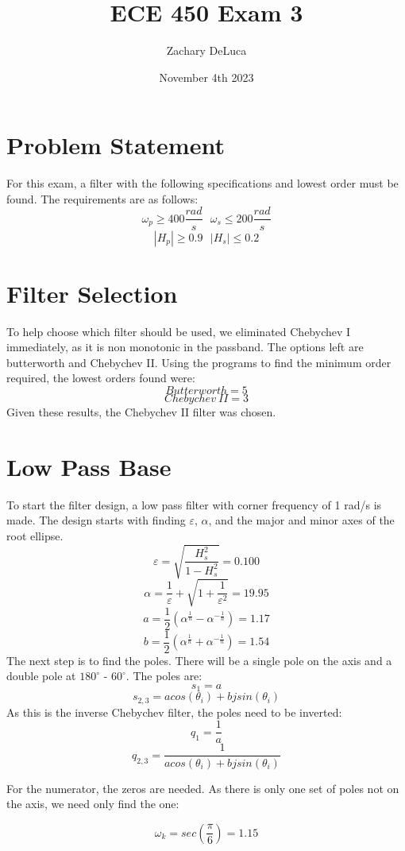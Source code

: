 \documentclass[12pt,a4paper]{article}
\title{ECE 450 Exam 3}
\author{Zachary DeLuca}
\date{November 4th 2023}
\begin{document}
	
	\maketitle
	\hline
	\section*{Problem Statement}
	For this exam, a filter with the following specifications and lowest order must be found. The requirements are as follows: 
	$$\omega_p \geq 400 \frac{rad}{s}\ \ \ \omega_s \leq 200 \frac{rad}{s}$$
	$$|H_p| \geq 0.9\ \ \ |H_s|\leq 0.2$$
	
	\section*{Filter Selection}
	To help choose which filter should be used, we  eliminated Chebychev I immediately, as it is non monotonic in the passband. The options left are butterworth and Chebychev II. Using the programs to find the minimum order required, the lowest orders found were: 
	$$Butterworth = 5$$
	$$Chebychev\ II= 3$$
	Given these results, the Chebychev II filter was chosen. 
	\section*{Low Pass Base}
	To start the filter design, a low pass filter with corner frequency of 1 rad/s is made. The design starts with finding $\varepsilon$, $\alpha$, and the major and minor axes of the root ellipse. 
	$$\varepsilon = \sqrt{\frac{H_s^2}{1-H_s^2}} = 0.100$$
	$$\alpha = \frac{1}{\varepsilon}+\sqrt{1+\frac{1}{\varepsilon^2}} = 19.95$$
	$$a = \frac{1}{2}\left(\alpha^{\frac{1}{n}}-\alpha^{-\frac{1}{n}}\right) = 1.17$$
	$$b = \frac{1}{2}\left(\alpha^{\frac{1}{n}}+\alpha^{-\frac{1}{n}}\right)=1.54$$
	The next step is to find the poles. There will be a single pole on the axis and a double pole at $180^{\circ}$ - $60^{\circ}$. The poles are: 
	$$s_1 = a$$
	$$s_{2,3}=acos(\theta_i) + bjsin(\theta_i)$$
	As this is the inverse Chebychev filter, the poles need to be inverted:
	$$q_{1} = \frac{1}{a}$$
	$$q_{2,3}=\frac{1}{acos(\theta_i) + bjsin(\theta_i)}$$
	
	For the numerator, the zeros are needed. As there is only one set of poles not on the axis, we need only find the one:
	
	$$\omega_k = sec\left(\frac{\pi}{6}\right)=1.15$$
	
\end{document}
